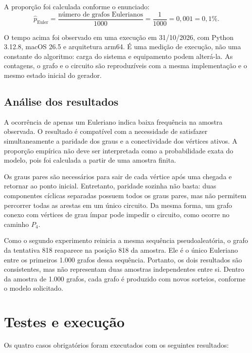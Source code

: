 \documentclass[11pt,a4paper]{article}
\begin{document}
A proporção foi calculada conforme o enunciado:
\[
\widehat{p}_{\mathrm{Euler}}
  =\frac{\text{número de grafos Eulerianos}}{1000}
  =\frac{1}{1000}=0{,}001=0{,}1\%.
\]

O tempo acima foi observado em uma execução em 31/10/2026, com
Python 3.12.8, macOS 26.5 e arquitetura arm64. É uma medição de execução,
não uma constante do algoritmo: carga do sistema e equipamento podem
alterá-la. As contagens, o grafo e o circuito são reproduzíveis com
a mesma implementação e o mesmo estado inicial do gerador.

\subsection{Análise dos resultados}

A ocorrência de apenas um Euleriano indica baixa frequência na amostra
observada. O resultado é compatível com a necessidade de satisfazer
simultaneamente a paridade dos graus e a conectividade dos vértices ativos.
A proporção empírica não deve ser interpretada como a probabilidade exata
do modelo, pois foi calculada a partir de uma amostra finita.

Os graus pares são necessários para sair de cada vértice após uma chegada
e retornar ao ponto inicial. Entretanto, paridade sozinha não basta:
duas componentes cíclicas separadas possuem todos os graus pares, mas
não permitem percorrer todas as arestas em um único circuito. Da mesma
forma, um grafo conexo com vértices de grau ímpar pode impedir o circuito,
como ocorre no caminho $P_4$.

Como o segundo experimento reinicia a mesma sequência pseudoaleatória,
o grafo da tentativa 818 reaparece na posição 818 da amostra. Ele é o único
Euleriano entre os primeiros 1.000 grafos dessa sequência. Portanto, os
dois resultados são consistentes, mas não representam duas amostras
independentes entre si. Dentro da amostra de 1.000 grafos, cada grafo
é produzido com novos sorteios, conforme o modelo solicitado.

\newpage
\section{Testes e execução}

Os quatro casos obrigatórios foram executados com os seguintes resultados:
\end{document}
